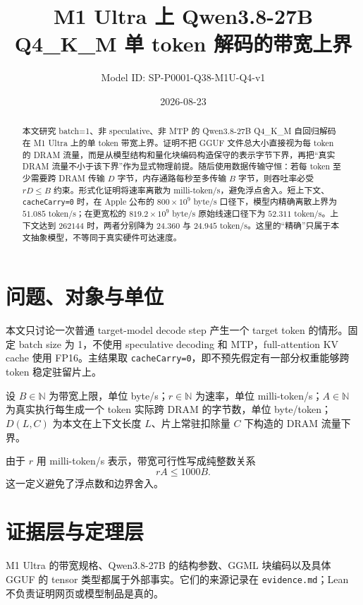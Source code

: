 \documentclass[11pt,a4paper]{ctexart}
\title{M1 Ultra 上 Qwen3.8-27B Q4\_K\_M 单 token 解码的带宽上界}
\author{Model ID: SP-P0001-Q38-M1U-Q4-v1}
\date{2026-08-23}
\begin{document}
\maketitle

\begin{abstract}
本文研究 batch=1、非 speculative、非 MTP 的 Qwen3.8-27B Q4\_K\_M 自回归解码在 M1 Ultra 上的单 token 带宽上界。证明不把 GGUF 文件总大小直接视为每 token 的 DRAM 流量，而是从模型结构和量化块编码构造保守的表示字节下界，再把“真实 DRAM 流量不小于该下界”作为显式物理前提。随后使用数据传输守恒：若每 token 至少需要跨 DRAM 传输 $D$ 字节，内存通路每秒至多传输 $B$ 字节，则吞吐率必受 $rD\le B$ 约束。形式化证明将速率离散为 milli-token/s，避免浮点舍入。短上下文、\texttt{cacheCarry=0} 时，在 Apple 公布的 $800\times10^9$ byte/s 口径下，模型内精确离散上界为 $51.085$ token/s；在更宽松的 $819.2\times10^9$ byte/s 原始线速口径下为 $52.311$ token/s。上下文达到 $262144$ 时，两者分别降为 $24.360$ 与 $24.945$ token/s。这里的“精确”只属于本文抽象模型，不等同于真实硬件可达速度。
\end{abstract}

\section{问题、对象与单位}

本文只讨论一次普通 target-model decode step 产生一个 target token 的情形。固定 batch size 为 1，不使用 speculative decoding 和 MTP，full-attention KV cache 使用 FP16。主结果取 \texttt{cacheCarry=0}，即不预先假定有一部分权重能够跨 token 稳定驻留片上。

设 $B\in\mathbb N$ 为带宽上限，单位 byte/s；$r\in\mathbb N$ 为速率，单位 milli-token/s；$A\in\mathbb N$ 为真实执行每生成一个 token 实际跨 DRAM 的字节数，单位 byte/token；$D(L,C)$ 为本文在上下文长度 $L$、片上常驻扣除量 $C$ 下构造的 DRAM 流量下界。

由于 $r$ 用 milli-token/s 表示，带宽可行性写成纯整数关系
\begin{equation}
  rA\le 1000B.
  \label{eq:feasible}
\end{equation}
这一定义避免了浮点数和边界舍入。

\section{证据层与定理层}

M1 Ultra 的带宽规格、Qwen3.8-27B 的结构参数、GGML 块编码以及具体 GGUF 的 tensor 类型都属于外部事实。它们的来源记录在 \texttt{evidence.md}；Lean 不负责证明网页或模型制品是真的。
\end{document}
